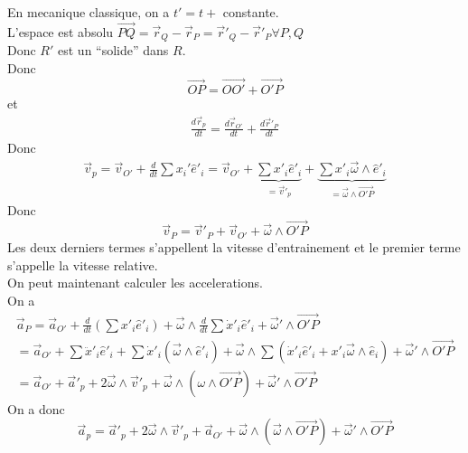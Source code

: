 \documentclass[../main.tex]{subfiles}
\begin{document}
En mecanique classique, on a $t' = t+$ constante.\\
L'espace est absolu $\vec{PQ}= \vec{r}_Q - \vec{r}_P = \vec{r}'_Q - \vec{r}'_P \forall P, Q$ \\
Donc $R'$ est un ``solide'' dans $R$.\\
Donc
\[ 
\vec{OP} = \vec{ OO' } + \vec{O'P}
\]
et 
\begin{align*}
\frac{d \vec{r}_p}{dt} = \frac{d \vec{r}_{O'} }{dt} + \frac{d \vec{r}'_P}{dt}
\end{align*}
Donc
\begin{align*}
\vec{v}_p = \vec{v}_{O'}  + \frac{d}{dt} \sum x_{i} ' \hat{e}'_i = \vec{v}_{O'}  + \underbrace{\sum x'_{i}  \hat{e}'_i}_{= \vec{v}'_p} + \underbrace{\sum x'_i \vec{\omega}\land \hat{e}'_i}_{= \vec{\omega} \land \vec{O'P}}
\end{align*}
Donc
\[ 
	\vec{v}_P = \vec{v}'_P + \vec{v}_{O'}  + \vec{\omega} \land \vec{O'P}
\]
Les deux derniers termes s'appellent la vitesse d'entrainement et le premier terme s'appelle la vitesse relative.\\
On peut maintenant calculer les accelerations.\\
On a
\begin{align*}
	\vec{a}_P = \vec{a}_{O'}  + \frac{d}{dt} \left( \sum x'_i \hat{e}'_i \right) + \vec{\omega} \land \frac{d}{dt}\sum \dot{ x }'_i \hat{e}'_i + \vec{\omega}' \land \vec{O'P}\\
	= \vec{a}_{O'}  + \sum \ddot{x}'_i \hat{e}'_i + \sum \dot{x}'_i ( \vec{\omega} \land \hat{e}'_i) + \vec{\omega} \land \sum( \dot{x}'_i \hat{e}'_i + x'_i \vec{\omega}\land \hat{e}_i)  + \vec{\omega}' \land \vec{O'P}\\
	= \vec{a}_{O'}  + \vec{a}'_p + 2 \vec{\omega} \land \vec{v}'_p + \vec{\omega} \land ( \omega \land \vec{O'P}) + \vec{\omega}' \land \vec{O'P}
\end{align*}
On a donc
\[ 
	\vec{a}_p = \vec{a}'_p + 2 \vec{\omega}\land \vec{v}'_p + \vec{a}_{O'}  + \vec{\omega}  \land ( \vec{\omega} \land \vec{O'P}) + \vec{\omega}' \land \vec{O'P}
\]
\end{document}
